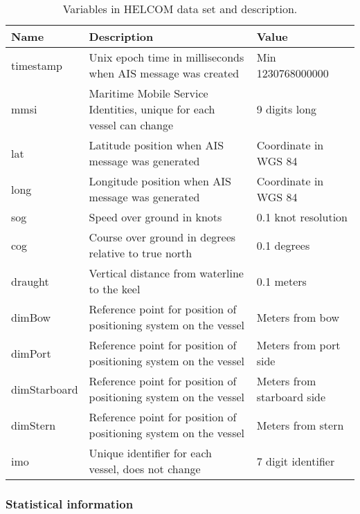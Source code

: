 \documentclass[../main.tex]{subfiles}
\begin{document}
\begin{table}[H]
\centering
\begin{tabular}{|l|m{7cm}|l|}
\hline
\textbf{Name} & \textbf{Description}                                                  & \textbf{Value}             \\ \hline
timestamp     & Unix epoch time in milliseconds when AIS message was created          & Min 1230768000000          \\ \hline
mmsi          & Maritime Mobile Service Identities, unique for each vessel can change & 9 digits long              \\ \hline
lat           & Latitude position when AIS message was generated                      & Coordinate in WGS 84       \\ \hline
long          & Longitude position when AIS message was generated                     & Coordinate in WGS 84       \\ \hline
sog           & Speed over ground in knots                                            & 0.1 knot resolution        \\ \hline
cog           & Course over ground in degrees relative to true north                  & 0.1 degrees                \\ \hline
draught       & Vertical distance from waterline to the keel                          & 0.1 meters                 \\ \hline
dimBow        & Reference point for position of positioning system on the vessel      & Meters from bow            \\ \hline
dimPort       & Reference point for position of positioning system on the vessel      & Meters from port side      \\ \hline
dimStarboard  & Reference point for position of positioning system on the vessel      & Meters from starboard side \\ \hline
dimStern      & Reference point for position of positioning system on the vessel      & Meters from stern          \\ \hline
imo           & Unique identifier for each vessel, does not change                    & 7 digit identifier         \\ \hline
\end{tabular}
\caption{Variables in HELCOM data set and description.}
\label{tabl:HELCOM-features}
\end{table}

\subsubsection{Statistical information}
\end{document}
